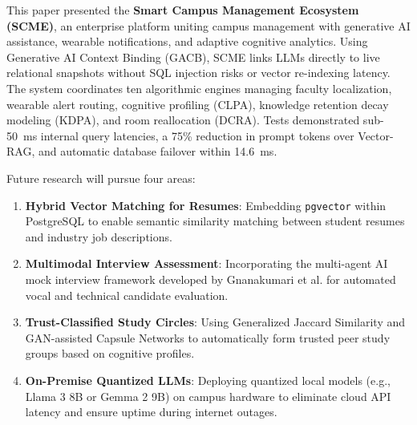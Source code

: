 \documentclass[conference]{IEEEtran}
\begin{document}
This paper presented the \textbf{Smart Campus Management Ecosystem (SCME)}, an enterprise platform uniting campus management with generative AI assistance, wearable notifications, and adaptive cognitive analytics. Using Generative AI Context Binding (GACB), SCME links LLMs directly to live relational snapshots without SQL injection risks or vector re-indexing latency. The system coordinates ten algorithmic engines managing faculty localization, wearable alert routing, cognitive profiling (CLPA), knowledge retention decay modeling (KDPA), and room reallocation (DCRA). Tests demonstrated sub-50~ms internal query latencies, a 75\% reduction in prompt tokens over Vector-RAG, and automatic database failover within 14.6~ms.

Future research will pursue four areas:
\begin{enumerate}
    \item \textbf{Hybrid Vector Matching for Resumes}: Embedding \texttt{pgvector} within PostgreSQL to enable semantic similarity matching between student resumes and industry job descriptions.
    \item \textbf{Multimodal Interview Assessment}: Incorporating the multi-agent AI mock interview framework developed by Gnanakumari et al. \cite{gnanakumari2025multi} for automated vocal and technical candidate evaluation.
    \item \textbf{Trust-Classified Study Circles}: Using Generalized Jaccard Similarity and GAN-assisted Capsule Networks \cite{gnanakumari2023social, gnanakumari2024trust} to automatically form trusted peer study groups based on cognitive profiles.
    \item \textbf{On-Premise Quantized LLMs}: Deploying quantized local models (e.g., Llama 3 8B or Gemma 2 9B) on campus hardware to eliminate cloud API latency and ensure uptime during internet outages.
\end{enumerate}
\end{document}
